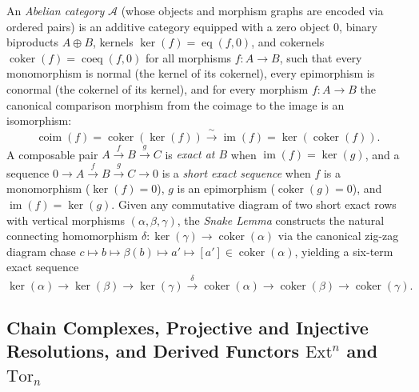 An \emph{Abelian category} $\mathcal{A}$ (whose objects and morphism graphs are encoded via ordered pairs) is an additive category equipped with a zero object $0$, binary biproducts $A \oplus B$, kernels $\ker(f) = \operatorname{eq}(f, 0)$, and cokernels $\operatorname{coker}(f) = \operatorname{coeq}(f, 0)$ for all morphisms $f\colon A \to B$, such that every monomorphism is normal (the kernel of its cokernel), every epimorphism is conormal (the cokernel of its kernel), and for every morphism $f\colon A \to B$ the canonical comparison morphism from the coimage to the image is an isomorphism:
\[
\operatorname{coim}(f) = \operatorname{coker}(\ker(f)) \xrightarrow{\;\sim\;} \operatorname{im}(f) = \ker(\operatorname{coker}(f)).
\]
A composable pair $A \xrightarrow{f} B \xrightarrow{g} C$ is \emph{exact at $B$} when $\operatorname{im}(f) = \ker(g)$, and a sequence $0 \to A \xrightarrow{f} B \xrightarrow{g} C \to 0$ is a \emph{short exact sequence} when $f$ is a monomorphism ($\ker(f) = 0$), $g$ is an epimorphism ($\operatorname{coker}(g) = 0$), and $\operatorname{im}(f) = \ker(g)$. Given any commutative diagram of two short exact rows with vertical morphisms $(\alpha, \beta, \gamma)$, the \emph{Snake Lemma} constructs the natural connecting homomorphism $\delta\colon \ker(\gamma) \to \operatorname{coker}(\alpha)$ via the canonical zig-zag diagram chase $c \mapsto b \mapsto \beta(b) \mapsto a' \mapsto [a'] \in \operatorname{coker}(\alpha)$, yielding a six-term exact sequence
\[
\ker(\alpha) \longrightarrow \ker(\beta) \longrightarrow \ker(\gamma) \xrightarrow{\;\delta\;} \operatorname{coker}(\alpha) \longrightarrow \operatorname{coker}(\beta) \longrightarrow \operatorname{coker}(\gamma).
\]

\subsection{Chain Complexes, Projective and Injective Resolutions, and Derived Functors $\mathrm{Ext}^n$ and $\mathrm{Tor}_n$}
\label{subsec:chain_complexes_resolutions_derived_functors_ext_tor}


